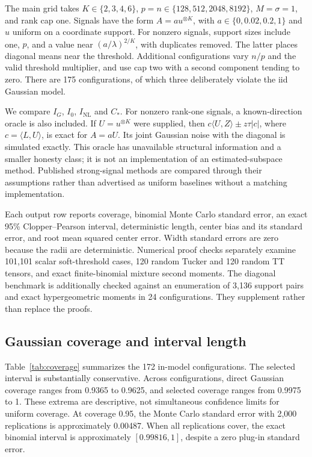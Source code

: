 \documentclass[11pt]{article}
\theoremstyle{remark}
\newcommand{\ip}[2]{\langle #1,#2\rangle}
\newcommand{\NL}{\mathrm{NL}}
\begin{document}
The main grid takes $K\in\{2,3,4,6\}$, $p=n\in\{128,512,2048,8192\}$, $M=\sigma=1$, and rank cap one. Signals have the form $A=a u^{\otimes K}$, with $a\in\{0,0.02,0.2,1\}$ and $u$ uniform on a coordinate support. For nonzero signals, support sizes include one, $p$, and a value near $(a/\lambda)^{2/K}$, with duplicates removed. The latter places diagonal means near the threshold. Additional configurations vary $n/p$ and the valid threshold multiplier, and use cap two with a second component tending to zero. There are 175 configurations, of which three deliberately violate the iid Gaussian model.

We compare $I_G$, $I_0$, $I_{\NL}$ and $C_*$. For nonzero rank-one signals, a known-direction oracle is also included. If $U=u^{\otimes K}$ were supplied, then $c\ip UZ\pm z\tau|c|$, where $c=\ip LU$, is exact for $A=aU$. Its joint Gaussian noise with the diagonal is simulated exactly. This oracle has unavailable structural information and a smaller honesty class; it is not an implementation of an estimated-subspace method. Published strong-signal methods are compared through their assumptions rather than advertised as uniform baselines without a matching implementation.

Each output row reports coverage, binomial Monte Carlo standard error, an exact 95\% Clopper--Pearson interval, deterministic length, center bias and its standard error, and root mean squared center error. Width standard errors are zero because the radii are deterministic. Numerical proof checks separately examine 101,101 scalar soft-threshold cases, 120 random Tucker and 120 random TT tensors, and exact finite-binomial mixture second moments. The diagonal benchmark is additionally checked against an enumeration of 3,136 support pairs and exact hypergeometric moments in 24 configurations. They supplement rather than replace the proofs.

\subsection{Gaussian coverage and interval length}
Table~\ref{tab:coverage} summarizes the 172 in-model configurations. The selected interval is substantially conservative. Across configurations, direct Gaussian coverage ranges from 0.9365 to 0.9625, and selected coverage ranges from 0.9975 to 1. These extrema are descriptive, not simultaneous confidence limits for uniform coverage. At coverage 0.95, the Monte Carlo standard error with 2,000 replications is approximately 0.00487. When all replications cover, the exact binomial interval is approximately $[0.99816,1]$, despite a zero plug-in standard error.
\end{document}
